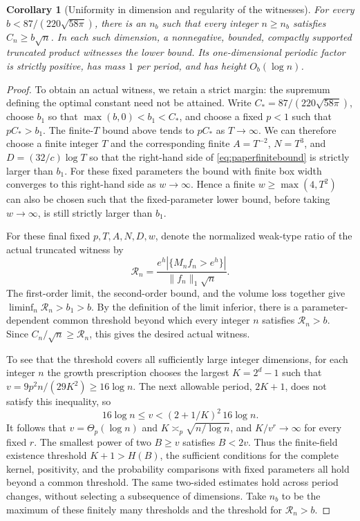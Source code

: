 \documentclass[a4paper,11pt]{article}
\newtheorem{corollary}[lemma]{Corollary}
\theoremstyle{remark}
\begin{document}
\begin{corollary}[Uniformity in dimension and regularity of the witnesses]\label{cor:paperwitness}
For every $b<87/(220\sqrt{58\pi})$, there is an $n_b$ such that every integer $n\ge n_b$ satisfies
$C_n\ge b\sqrt n$. In each such dimension, a nonnegative, bounded, compactly supported truncated product
witnesses the lower bound. Its one-dimensional periodic factor is strictly positive, has mass $1$ per period, and has height
$O_b(\log n)$.
\end{corollary}
\begin{proof}
To obtain an actual witness, we retain a strict margin: the supremum defining the optimal constant need not be attained.
Write $C_*=87/(220\sqrt{58\pi})$, choose $b_1$ so that
$\max(b,0)<b_1<C_*$, and choose a fixed $p<1$ such that $pC_*>b_1$.
The finite-$T$ bound above tends to $pC_*$ as $T\to\infty$.
We can therefore choose a finite integer $T$ and the corresponding finite $A=T^{-2}$, $N=T^3$, and
$D=(32/c)\log T$ so that the right-hand side of \eqref{eq:paperfinitebound} is strictly larger than $b_1$.
For these fixed parameters the bound with finite box width converges to this right-hand side as $w\to\infty$.
Hence a finite $w\ge\max(4,T^2)$ can also be chosen such that the fixed-parameter lower bound, before taking $w\to\infty$,
is still strictly larger than $b_1$.

For these final fixed $p,T,A,N,D,w$, denote the normalized weak-type ratio of the actual truncated witness by
\[
 \mathcal R_n=\frac{e^h|\{M_nf_n>e^h\}|}{\|f_n\|_1\sqrt n}.
\]
The first-order limit, the second-order bound, and the volume loss together give
$\liminf_n\mathcal R_n>b_1>b$.
By the definition of the limit inferior, there is a parameter-dependent common threshold beyond which every integer $n$ satisfies
$\mathcal R_n>b$. Since $C_n/\sqrt n\ge\mathcal R_n$, this gives the desired actual witness.

To see that the threshold covers all sufficiently large integer dimensions, for each integer $n$ the growth prescription
chooses the largest $K=2^d-1$ such that $v=9p^2n/(29K^2)\ge16\log n$.
The next allowable period, $2K+1$, does not satisfy this inequality, so
\[
 16\log n\le v<(2+1/K)^2\,16\log n.
\]
It follows that $v=\Theta_p(\log n)$ and $K\asymp_p\sqrt{n/\log n}$,
and $K/v^r\to\infty$ for every fixed $r$. The smallest power of two $B\ge v$
satisfies $B<2v$. Thus the finite-field existence threshold $K+1>H(B)$,
the sufficient conditions for the complete kernel, positivity, and the probability comparisons with fixed parameters
all hold beyond a common threshold. The same two-sided estimates hold across period changes, without selecting a subsequence of dimensions.
Take $n_b$ to be the maximum of these finitely many thresholds and the threshold for $\mathcal R_n>b$.


\end{proof}
\end{document}
